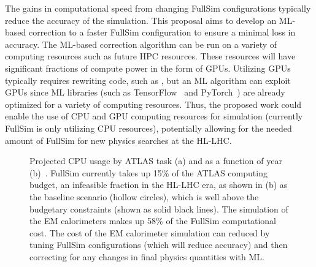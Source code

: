 \documentclass[letter, USenglish, 11pt, subfigure]{article}
\begin{document}
The gains in computational speed from changing FullSim configurations typically reduce the accuracy of the simulation. This proposal aims to develop an ML-based correction to a faster FullSim configuration to ensure a minimal loss in accuracy. The ML-based correction algorithm can be run on a variety of computing resources such as future HPC resources. These resources will have significant fractions of compute power in the form of GPUs. Utilizing GPUs typically requires rewriting code, such as \GEANT, but an ML algorithm can exploit GPUs since ML libraries (such as TensorFlow~\cite{tensorflow2015-whitepaper} and PyTorch~\cite{NEURIPS2019_9015}) are already optimized for a variety of computing resources. Thus, the proposed work could enable the use of CPU and GPU computing resources for simulation (currently FullSim is only utilizing CPU resources), potentially allowing for the needed amount of FullSim for new physics searches at the HL-LHC.

\begin{figure}[!htbp]
  \centering
  \caption{\label{fig:currentComputing} Projected CPU usage by ATLAS task (a) and as a function of year (b)~\cite{computingCDR}. FullSim currently takes up 15\% of the ATLAS computing budget, an infeasible fraction in the HL-LHC era, as shown in (b) as the baseline scenario (hollow circles), which is well above the budgetary constraints (shown as solid black lines). The simulation of the EM calorimeters makes up 58\% of the FullSim computational cost. The cost of the EM calorimeter simulation can reduced by tuning FullSim configurations (which will reduce accuracy) and then correcting for any changes in final physics quantities with ML.}
\end{figure}
\end{document}
